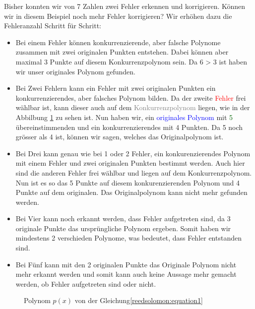 \begin{beispiel}
Bisher konnten wir von 7 Zahlen zwei Fehler erkennen und korrigieren. Können wir in diesem Beispiel noch mehr Fehler korrigieren? 
Wir erhöhen dazu die Fehleranzahl Schritt für Schritt:
\begin{itemize}
    \item[\textit{1 Fehler}:] Bei einem Fehler können konkurrenzierende, aber falsche Polynome zusammen mit zwei originalen Punkten entstehen.
        Dabei können aber maximal 3 Punkte auf diesem Konkurrenzpolynom sein.
        Da 6 > 3 ist haben wir unser originales Polynom gefunden.
    \item[\textit{2 Fehler}:] Bei Zwei Fehlern kann ein Fehler mit zwei originalen Punkten ein konkurrenzierendes, aber falsches Polynom bilden.
        Da der zweite \textcolor{red}{Fehler} frei wählbar ist, kann dieser auch auf dem \textcolor{gray}{Konkurrenzpolynom} liegen, wie in der Abbilbung \ref{fig:polynom} zu sehen ist.
        Nun haben wir, ein \textcolor{blue}{originales Polynom} mit \textcolor{darkgreen}{5} übereinstimmenden und ein konkurrenzierendes mit 4 Punkten.
        Da 5 noch grösser als 4 ist, können wir sagen, welches das Originalpolynom ist.
    \item[\textit{3 Fehler}:] Bei Drei kann genau wie bei 1 oder 2 Fehler, ein konkurenzierendes Polynom mit einem Fehler und zwei originalen Punkten bestimmt werden.
        Auch hier sind die anderen Fehler frei wählbar und liegen auf dem Konkurrenzpolynom.
        Nun ist es so das 5 Punkte auf diesem konkurenzierenden Polynom und 4 Punkte auf dem originalen.
        Das Originalpolynom kann nicht mehr gefunden werden.
    \item[\textit{4 Fehler}:] Bei Vier kann noch erkannt werden, dass Fehler aufgetreten sind, da 3 originale Punkte das ursprüngliche Polynom ergeben.
        Somit haben wir mindestens 2 verschieden Polynome, was bedeutet, dass Fehler entstanden sind.
    \item[\textit{5 Fehler:}] Bei Fünf kann mit den 2 originalen Punkte das Originale Polynom nicht mehr erkannt werden und 
        somit kann auch keine Aussage mehr gemacht werden, ob Fehler aufgetreten sind oder nicht.
\end{itemize}

\begin{figure}%
	\centering
    
	\caption{Polynom $p(x)$ von der Gleichung\eqref{reedsolomon:equation1}}
	\label{fig:polynom}
\end{figure}
\qedhere
\end{beispiel}

